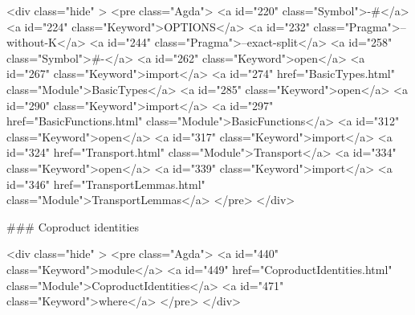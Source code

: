   <div class="hide" >
<pre class="Agda">
<a id="220" class="Symbol">{-#</a> <a id="224" class="Keyword">OPTIONS</a> <a id="232" class="Pragma">--without-K</a> <a id="244" class="Pragma">--exact-split</a> <a id="258" class="Symbol">#-}</a>
<a id="262" class="Keyword">open</a> <a id="267" class="Keyword">import</a> <a id="274" href="BasicTypes.html" class="Module">BasicTypes</a>
<a id="285" class="Keyword">open</a> <a id="290" class="Keyword">import</a> <a id="297" href="BasicFunctions.html" class="Module">BasicFunctions</a>
<a id="312" class="Keyword">open</a> <a id="317" class="Keyword">import</a> <a id="324" href="Transport.html" class="Module">Transport</a>
<a id="334" class="Keyword">open</a> <a id="339" class="Keyword">import</a> <a id="346" href="TransportLemmas.html" class="Module">TransportLemmas</a>
</pre>
</div>

### Coproduct identities

<div class="hide" >
<pre class="Agda">
<a id="440" class="Keyword">module</a>
  <a id="449" href="CoproductIdentities.html" class="Module">CoproductIdentities</a>
  <a id="471" class="Keyword">where</a>
</pre>
</div>

